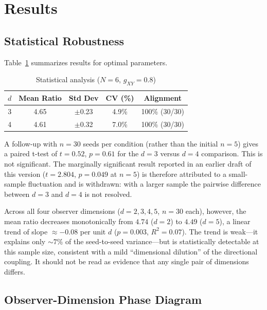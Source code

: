 \documentclass[12pt,a4paper]{article}
\begin{document}
\section{Results}\label{sec:results}

\subsection{Statistical Robustness}

Table~\ref{tab:stats} summarizes results for optimal parameters.

\begin{table}[ht]
\centering
\caption{Statistical analysis ($N=6$, $g_{XY}=0.8$)}
\label{tab:stats}
\begin{tabular}{ccccc}
\toprule
$d$ & Mean Ratio & Std Dev & CV (\%) & Alignment \\
\midrule
3 & 4.65 & $\pm$0.23 & 4.9\% & 100\% (30/30) \\
4 & 4.61 & $\pm$0.32 & 7.0\% & 100\% (30/30) \\
\bottomrule
\end{tabular}
\end{table}

A follow-up with $n=30$ seeds per condition (rather than the initial $n=5$)
gives a paired t-test of $t = 0.52$, $p = 0.61$ for the $d=3$ versus $d=4$
comparison. This is not significant. The marginally significant result
reported in an earlier draft of this version ($t=2.804$, $p=0.049$ at
$n=5$) is therefore attributed to a small-sample fluctuation and is
withdrawn: with a larger sample the pairwise difference between $d=3$ and
$d=4$ is not resolved.

Across all four observer dimensions ($d=2,3,4,5$, $n=30$ each), however, the
mean ratio decreases monotonically from $4.74$ ($d=2$) to $4.49$ ($d=5$), a
linear trend of slope $\approx -0.08$ per unit $d$ ($p=0.003$,
$R^2=0.07$). The trend is weak---it explains only $\sim 7\%$ of the
seed-to-seed variance---but is statistically detectable at this sample size,
consistent with a mild ``dimensional dilution'' of the directional coupling.
It should not be read as evidence that any single pair of dimensions
differs.

\subsection{Observer-Dimension Phase Diagram}\label{sec:phase_diagram}
\end{document}

